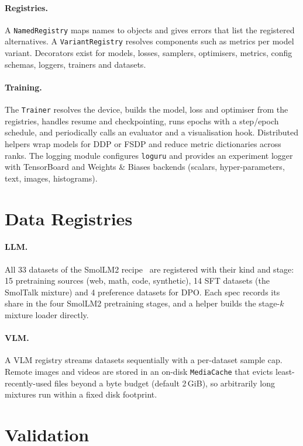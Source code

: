\documentclass[11pt]{article}
\begin{document}
\paragraph{Registries.} A \texttt{NamedRegistry} maps names to objects and gives errors that
list the registered alternatives. A \texttt{VariantRegistry} resolves components such as
metrics per model variant. Decorators exist for models, losses, samplers, optimisers,
metrics, config schemas, loggers, trainers and datasets.

\paragraph{Training.} The \texttt{Trainer} resolves the device, builds the model, loss and
optimiser from the registries, handles resume and checkpointing, runs epochs with a
step/epoch schedule, and periodically calls an evaluator and a visualisation hook.
Distributed helpers wrap models for DDP or FSDP and reduce metric dictionaries across
ranks. The logging module configures \texttt{loguru} and provides an experiment logger
with TensorBoard and Weights \& Biases backends (scalars, hyper-parameters, text, images,
histograms).

\section{Data Registries}

\paragraph{LLM.} All 33 datasets of the SmolLM2 recipe~\cite{allal2025smollm2} are registered with
their kind and stage: 15 pretraining sources (web, math, code, synthetic), 14 SFT
datasets (the SmolTalk mixture) and 4 preference datasets for DPO. Each spec records its
share in the four SmolLM2 pretraining stages, and a helper builds the stage-$k$ mixture
loader directly.

\paragraph{VLM.} A VLM registry streams datasets sequentially with a per-dataset sample cap.
Remote images and videos are stored in an on-disk \texttt{MediaCache} that evicts
least-recently-used files beyond a byte budget (default 2\,GiB), so arbitrarily long
mixtures run within a fixed disk footprint.

\section{Validation}
\end{document}
